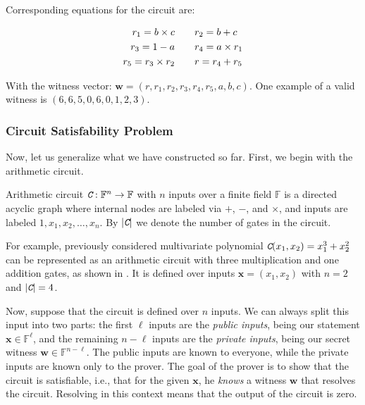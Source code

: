 \documentclass[../lecture-notes.tex]{subfiles}
\begin{document}
Corresponding equations for the circuit are:

\begin{equation*}
    \begin{aligned}
        r_1 = b \times c \hspace{10px} & & &
        r_2 = b + c \\
        r_3 = 1 - a \hspace{10px} & & &
        r_4 = a \times r_1 \\
        r_5 = r_3 \times r_2 \hspace{10px} & & &
        r = r_4 + r_5 \\
    \end{aligned}
\end{equation*}

With the witness vector: $\mathbf{w} = (r, r_1, r_2, r_3, r_4, r_5, a , b, c)$. One example of a valid witness is $(6, 6, 5, 0, 6, 0, 1, 2, 3)$.

\subsubsection{Circuit Satisfability Problem}

Now, let us generalize what we have constructed so far. First, we begin with the arithmetic circuit.

\newcommand{\Circ}{\textit{\texttt{C}}}
\begin{definition}
    Arithmetic circuit $\Circ: \mathbb{F}^n \to \mathbb{F}$ with $n$ inputs over a finite field $\mathbb{F}$ is a directed acyclic graph where internal nodes are labeled via $+$, $-$, and $\times$, and inputs are labeled $1,x_1,x_2,\dots,x_n$. By $|\Circ|$ we denote the number of gates in the circuit.
\end{definition}

\begin{example}
    For example, previously considered multivariate polynomial $\Circ(x_1,x_2) = x_1^3 + x_2^2$ can be represented as an arithmetic circuit with three multiplication and one addition gates, as shown in . It is defined over inputs $\mathbf{x}=(x_1,x_2)$ with $n=2$ and $|\Circ| = 4$.
\end{example}

Now, suppose that the circuit is defined over $n$ inputs. We can always split this input into two parts: the first $\ell$ inputs are the \textit{public inputs}, being our statement $\mathbf{x} \in \mathbb{F}^{\ell}$, and the remaining $n-\ell$ inputs are the \textit{private inputs}, being our secret witness $\mathbf{w} \in \mathbb{F}^{n-\ell}$. The public inputs are known to everyone, while the private inputs are known only to the prover. The goal of the prover is to show that the circuit is satisfiable, i.e., that for the given $\mathbf{x}$, he \textit{knows} a witness $\mathbf{w}$ that resolves the circuit. Resolving in this context means that the output of the circuit is zero.
\end{document}
